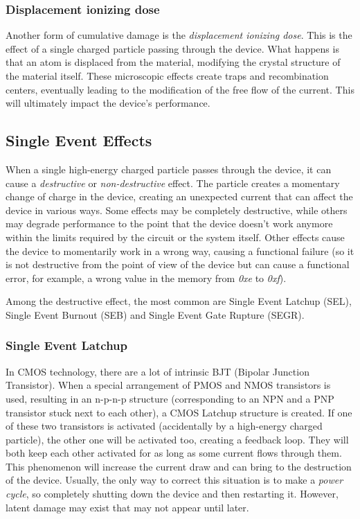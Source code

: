 \subsubsection{Displacement ionizing dose}
Another form of cumulative damage is the \textit{displacement ionizing dose}. This is the effect of a single charged particle passing through the device. What happens is that an atom is displaced from the material, modifying the crystal structure of the material itself. These microscopic effects create traps and recombination centers, eventually leading to the modification of the free flow of the current. This will ultimately impact the device's performance. \bigskip

\subsection{Single Event Effects}
When a single high-energy charged particle passes through the device, it can cause a \textit{destructive} or \textit{non-destructive} effect. The particle creates a momentary change of charge in the device, creating an unexpected current that can affect the device in various ways. Some effects may be completely destructive, while others may degrade performance to the point that the device doesn't work anymore within the limits required by the circuit or the system itself. Other effects cause the device to momentarily work in a wrong way, causing a functional failure (so it is not destructive from the point of view of the device but can cause a functional error, for example, a wrong value in the memory from \textit{0xe} to \textit{0xf}). \bigskip

Among the destructive effect, the most common are Single Event Latchup (SEL), Single Event Burnout (SEB) and Single Event Gate Rupture (SEGR).

\subsubsection{Single Event Latchup}
In CMOS technology, there are a lot of intrinsic BJT (Bipolar Junction Transistor). When a special arrangement of PMOS and NMOS transistors is used, resulting in an n-p-n-p structure (corresponding to an NPN and a PNP transistor stuck next to each other), a CMOS Latchup structure is created. If one of these two transistors is activated (accidentally by a high-energy charged particle), the other one will be activated too, creating a feedback loop. They will both keep each other activated for as long as some current flows through them. This phenomenon will increase the current draw and can bring to the destruction of the device. Usually, the only way to correct this situation is to make a \textit{power cycle}, so completely shutting down the device and then restarting it. However, latent damage may exist that may not appear until later. \bigskip

